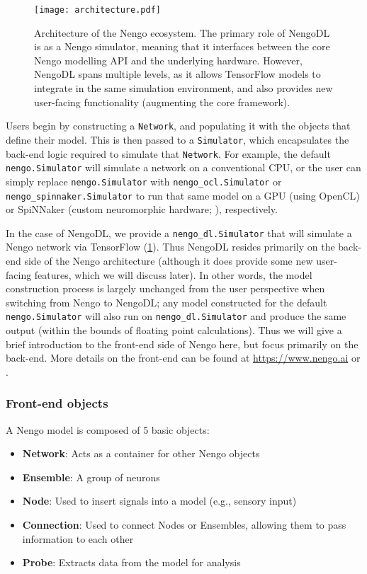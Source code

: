 \documentclass{article}
\begin{document}
\begin{figure}
\centering
\texttt{[image: architecture.pdf]}
\caption{Architecture of the Nengo ecosystem.  The primary role of NengoDL is as a Nengo simulator, meaning that it interfaces between the core Nengo modelling API and the underlying hardware.  However, NengoDL spans multiple levels, as it allows TensorFlow models to integrate in the same simulation environment, and also provides new user-facing functionality (augmenting the core framework).}
\label{fig:architecture}
\end{figure}

Users begin by constructing a \texttt{Network}, and populating it with the objects that define their model.  This is then passed to a \texttt{Simulator}, which encapsulates the back-end logic required to simulate that \texttt{Network}.  For example, the default \texttt{nengo.Simulator} will simulate a network on a conventional CPU, or the user can simply replace \texttt{nengo.Simulator} with \texttt{nengo\_ocl.Simulator} or \texttt{nengo\_spinnaker.Simulator} to run that same model on a GPU (using OpenCL) or SpiNNaker (custom neuromorphic hardware; \citealt{Khan2008}), respectively.  

In the case of NengoDL, we provide a \texttt{nengo\_dl.Simulator} that will simulate a Nengo network via TensorFlow (\ref{fig:architecture}).  Thus NengoDL resides primarily on the back-end side of the Nengo architecture (although it does provide some new user-facing features, which we will discuss later).  In other words, the model construction process is largely unchanged from the user perspective when switching from Nengo to NengoDL; any model constructed for the default \texttt{nengo.Simulator} will also run on \texttt{nengo\_dl.Simulator} and produce the same output (within the bounds of floating point calculations).  Thus we will give a brief introduction to the front-end side of Nengo here, but focus primarily on the back-end.  More details on the front-end can be found at \url{https://www.nengo.ai} or \citet{Bekolay2014}.

\subsubsection{Front-end objects}

A Nengo model is composed of 5 basic objects:

\begin{itemize}
\item {\bf Network}: Acts as a container for other Nengo objects
\item {\bf Ensemble}: A group of neurons
\item {\bf Node}: Used to insert signals into a model (e.g., sensory input)
\item {\bf Connection}: Used to connect Nodes or Ensembles, allowing them to pass information to each other
\item {\bf Probe}: Extracts data from the model for analysis
\end{itemize}
\end{document}
